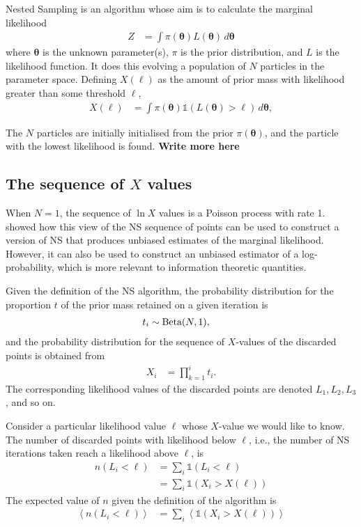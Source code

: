\documentclass[entropy,article,accept,oneauthor,pdftex,10pt,a4paper]{mdpi}
\newcommand{\todo}{\color{orange} \bf}
\newcommand{\x}{\boldsymbol{\theta}}
\begin{document}
Nested Sampling \citep[NS][]{skilling2006nested} is an algorithm whose aim is
to calculate the marginal likelihood
\begin{align}
Z &= \int \pi(\x) L(\x) \, d\x
\end{align}
where $\x$ is the unknown parameter(s), $\pi$ is the prior distribution,
and $L$ is the likelihood function. It does this evolving a population of
$N$ particles in the parameter space.
Defining $X(\ell)$ as the amount of prior mass with likelihood greater than
some threshold $\ell$,
\begin{align}
X(\ell) &= \int \pi(\x) \mathds{1}\left(L(\x) > \ell\right) \, d\x,
\end{align} 

The $N$ particles are initially initialised from the prior $\pi(\x)$, and the particle with the lowest likelihood is found.
{\todo Write more here}

\subsection{The sequence of $X$ values}

When $N=1$, the sequence of $\ln X$ values is a Poisson process with rate
1. \citet{Walter2015} showed how this view of the NS sequence of points
can be used to construct a
version of NS that produces unbiased estimates of the marginal likelihood.
However, it can also be used to construct an unbiased estimator of
a log-probability, which is more relevant to information theoretic
quantities.

Given the definition of the NS algorithm,
the probability distribution for the proportion $t$ of the prior mass
retained on a given iteration is
\begin{align}
t_i &\sim \textnormal{Beta}(N, 1),
\end{align}
and the probability distribution for the sequence of $X$-values of
the discarded points is obtained from
\begin{align}
X_i &= \prod_{k=1}^i t_i.
\end{align}
The corresponding likelihood values of the discarded points are
denoted $L_1, L_2, L_3$, and so on.

Consider a particular likelihood value $\ell$ whose $X$-value
we would like to know.
The number of discarded points with likelihood below $\ell$, i.e.,
the number of NS iterations taken reach a likelihood above
$\ell$, is
\begin{align}
n(L_i < \ell) &= \sum_i \mathds{1}\left(L_i < \ell\right) \\
              &= \sum_i \mathds{1}\left(X_i > X(\ell)\right)
\end{align}
The expected value of $n$ given the definition of the algorithm is
\begin{align}
\left<n(L_i < \ell)\right> &= 
              \sum_i \left<\mathds{1}\left(X_i > X(\ell)\right)\right>
\end{align}
\end{document}
